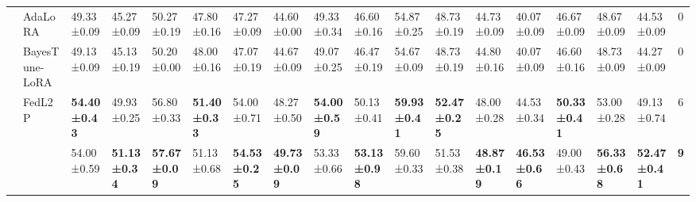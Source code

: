 \begin{table*}[t]
\begin{scriptsize}
{\begin{tabular}{c|l|l|l|l|l|l|l|l|l|l|l|l|l|l|l|l|c}
                    & AdaLoRA                              & 49.33±0.09                       & 45.27±0.09                       & 50.27±0.19                       & 47.80±0.16                        & 47.27±0.09                       & 44.60±0.00                        & 49.33±0.34                       & 46.60±0.16                        & 54.87±0.25                       & 48.73±0.19                       & 44.73±0.09                       & 40.07±0.09                       & 46.67±0.09                       & 48.67±0.09                       & 44.53±0.09                       & 0             \\ %
                    & BayesTune-LoRA                            & 49.13±0.09                       & 45.13±0.19                       & 50.20±0.00                        & 48.00±0.16                        & 47.07±0.19                       & 44.67±0.09                       & 49.07±0.25                       & 46.47±0.19                       & 54.67±0.09                       & 48.73±0.19                       & 44.80±0.16                        & 40.07±0.09                       & 46.60±0.16                        & 48.73±0.09                       & 44.27±0.09                       & 0             \\ %
                    & FedL2P                               & \textbf{54.40±0.43}               & 49.93±0.25                       & 56.80±0.33                        & \textbf{51.40±0.33}               & 54.00±0.71                        & 48.27±0.50                       & \textbf{54.00±0.59}               & 50.13±0.41                       & \textbf{59.93±0.41}              & \textbf{52.47±0.25}              & 48.00±0.28                        & 44.53±0.34                       & \textbf{50.33±0.41}              & 53.00±0.28                        & 49.13±0.74                       & 6             \\ %
                    & \method{}                                 & 54.00±0.59                        & \textbf{51.13±0.34}              & \textbf{57.67±0.09}              & 51.13±0.68                       & \textbf{54.53±0.25}              & \textbf{49.73±0.09}              & 53.33±0.66                       & \textbf{53.13±0.98}              & 59.60±0.33                        & 51.53±0.38                       & \textbf{48.87±0.19}              & \textbf{46.53±0.66}              & 49.00±0.43                        & \textbf{56.33±0.68}              & \textbf{52.47±0.41}              & \textbf{9}    \\ \hline

\end{tabular}}
\end{scriptsize}
\end{table*}
